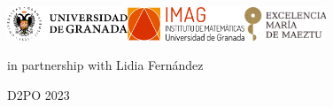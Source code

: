 
\def\maketitle{\ifbeamer@inframe\titlepage\else\frame[plain]{\titlepage}\fi}
\def\titlepage{\usebeamertemplate{title page}}
{
	\begin{minipage}[b][\paperheight]{\textwidth}
	\vspace*{5mm}
	\includegraphics[height=10mm]{Images/ugrH.png}\hfill \includegraphics[height=10mm]{Images/IMAG.png}\hspace{0.5cm}\includegraphics[height=10mm]{Images/maeztu.png}\par
	\vspace*{5mm}
	\vfill
	\ifx\insertsubtitle\@empty%
	\else%
		\centering
		{\MakeUppercase{\inserttitle}\par}%
	\fi%
	\ifx\insertsubtitle\@empty%
	\else%
		{\insertsubtitle\par}%
		\vspace*{5mm}
	\fi%
	\vfill	
	\ifx\insertauthor\@empty%
	\else%
		{\par}%
	\fi%
	{\footnotesize in partnership with} {\large Lidia Fernández}

	\ifx\insertinstitut\@empty%
	\else%
		\vspace*{3mm}
		{\insertinstitute\par}%
	\fi%
	\vfill
	D2PO 2023

	\ifx\insertdate\@empty%
	\else%
		{\insertdate\par}%
	\fi%
	
	
	
	\vspace*{5mm}
	\end{minipage}
}